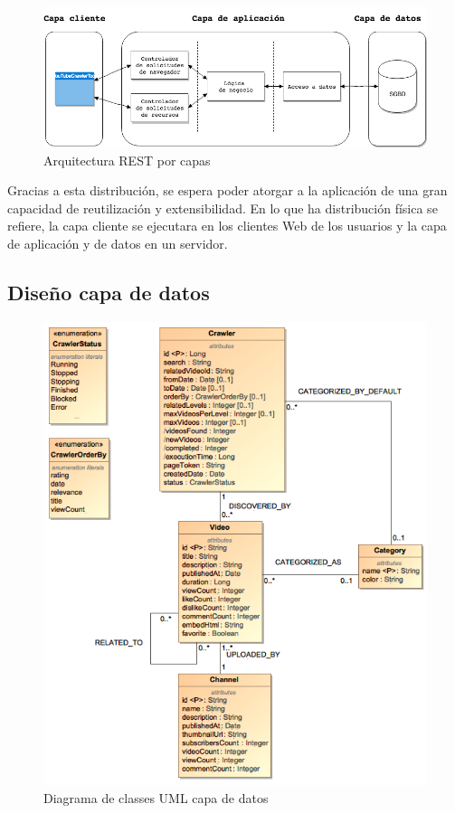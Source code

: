 \documentclass[11pt,a4paper]{article}
\begin{document}
\begin{figure}[H]
\centering
\includegraphics[scale=0.45]{diseno/ArquitecturaRESTPorCapas.png}
\caption{Arquitectura REST por capas}
\end{figure}


Gracias a esta distribución, se espera poder atorgar a la aplicación de una gran capacidad de reutilización y extensibilidad. En lo que ha distribución física se refiere, la capa cliente se ejecutara en los clientes Web de los usuarios y la capa de aplicación y de datos en un servidor. 
\medskip 

\subsection{Diseño capa de datos}

\begin{figure}[H]
\centering
\includegraphics[scale=0.6]{diseno/DatabaseUML.png}
\caption{Diagrama de classes UML capa de datos}
\end{figure}
\end{document}
